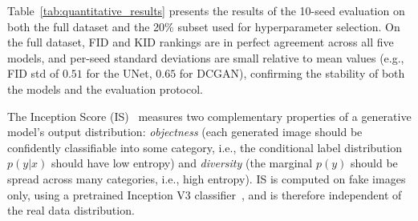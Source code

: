 \documentclass[runningheads]{llncs}
\begin{document}
\begin{table}[H]
\centering
\caption{Quantitative results (Mean $\pm$ Std Dev) across 10 random seeds for the 20\% subset and the full dataset (100\%).}\label{tab:quantitative_results}
\end{table}

\vspace{-0.5cm}

Table~\ref{tab:quantitative_results} presents the results of the 10-seed evaluation on both the full dataset and the 20\% subset used for hyperparameter selection. On the full dataset, FID and KID rankings are in perfect agreement across all five models, and per-seed standard deviations are small relative to mean values (e.g., FID std of $0.51$ for the UNet, $0.65$ for DCGAN), confirming the stability of both the models and the evaluation protocol.

The Inception Score (IS)~\cite{is} measures two complementary properties of a generative model's output distribution: \emph{objectness} (each generated image should be confidently classifiable into some category, i.e., the conditional label distribution $p(y|x)$ should have low entropy) and \emph{diversity} (the marginal $p(y)$ should be spread across many categories, i.e., high entropy). IS is computed on fake images only, using a pretrained Inception V3 classifier~\cite{DBLP:journals/corr/SzegedyVISW15}, and is therefore independent of the real data distribution.
\end{document}
